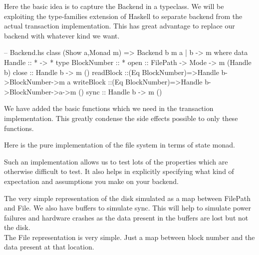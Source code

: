 \documentclass[11pt,a4paper]{article}
\begin{document}
Here the basic idea is to capture the Backend in a typeclass. We will be exploiting the type-families extension of Haskell to separate backend from the actual transaction implementation. This has great advantage to replace our backend with whatever kind we want.

\begin{code}[name=Backend,firstnumber=1]
-- Backend.hs
class (Show a,Monad m) => Backend b m a | b -> m where 
    data Handle :: * -> * 
    type BlockNumber :: *  
    open :: FilePath -> Mode -> m (Handle b)
    close :: Handle b -> m () 
    readBlock ::(Eq BlockNumber)=>Handle b->BlockNumber->m a 
    writeBlock ::(Eq BlockNumber)=>Handle b->BlockNumber->a->m ()
    sync :: Handle b -> m ()
\end{code}

We have added the basic functions which we need in the transaction implementation. This greatly condense the side effects possible to only these functions.

Here is the pure implementation of the file system in terms of state monad. 


Such an implementation allows us to test lots of the properties which are otherwise difficult to test. It also helps in explicitly specifying what kind of expectation and assumptions you make on your backend.

The very simple representation of the disk simulated as a map between FilePath and File. 
We also have buffers to simulate sync. This will help to simulate power failures and hardware crashes as the data present in the buffers are lost but not the disk. \\
The File representation is very simple. Just a map between block number and the data present at that location.
\end{document}
